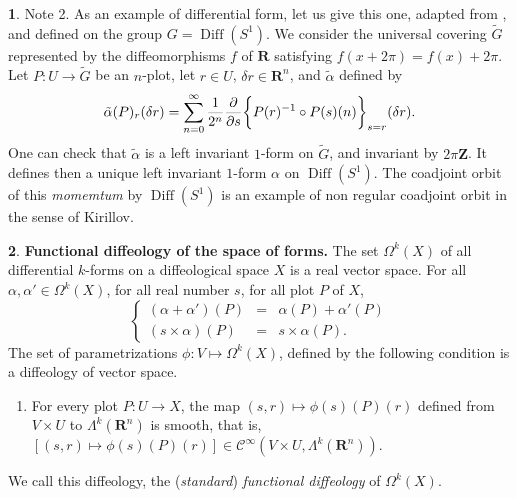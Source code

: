 \documentclass[11pt,reqno]{amsart}
\theoremstyle{definition}
\newtheorem{article}{}
\newcommand{\artlabel}[1]{{\bf #1.}}
\renewcommand{\over}{\above .2pt}
\newcommand{\RR}{{\mathbf R}}
\newcommand{\ZZ}{{\mathbf Z}}
\def \G{{G}}
\def \P{{P}}
\def \S{{S}}
\def \U{{U}}
\def \V{{V}}
\def \X{{X}}
\newcommand{\cC}{{\mathcal C}}
\newcommand{\DForms}{\Omega}
\newcommand{\Cinf}{{\cC}^\infty}
\newcommand{\Diff}{\operatorname{Diff}}
\begin{document}
\begin{article}
    {\sc Note 2.} As an example of differential form, let us give this one,
    adapted from \cite{Don94}, and defined on the group
    $\G = \Diff(S^1)$. We consider the universal covering $\tilde \G$
    represented by the diffeomorphisms $f$ of $\RR$ satisfying $f(x + 2\pi) = f(x) + 2\pi$.
    Let $\P : \U \to \tilde\G$ be an $n$-plot, 
    let $r \in \U$, $\delta r \in \RR^n$, and $\tilde\alpha$ defined by
    $$
    \tilde\alpha(\P)_r(\delta r) = \sum_{n=0}^\infty {1 \over 2^n} 
    {\partial \over \partial s}\bigg\{\P(r)^{-1} \circ \P(s)(n)\bigg\}_{s=r} (\delta r).
    $$
    One can check that $\tilde\alpha$ is a left invariant $1$-form on $\tilde\G$, and 
    invariant by $2\pi\ZZ$. It defines then a unique left invariant $1$-form $\alpha$ on
    $\Diff(\S^1)$. The coadjoint orbit of this {\em momemtum} by $\Diff(\S^1)$ is an
    example of non regular coadjoint orbit in the sense of Kirillov.
  \end{article} %
  
  \begin{article}\artlabel{Functional diffeology of the space of forms}
    \label{Functional-diffeology-of-the-space-of-forms} 
    The set $\Omega^k(\X)$ of all differential $k$-forms on a
    diffeological space $\X$ is a real vector space. For
    all $\alpha,\alpha' \in \Omega^k(\X)$, for all real number $s$,
    for all plot $\P$ of $\X$,
    $$
      \left\{
      \begin{array}{rcl}
      (\alpha + \alpha')(\P) & = & \alpha(\P) +
      \alpha'(\P) \\ (s\times \alpha)(\P) & = & s\times
      \alpha(\P). \end{array}
      \right.
      $$
    The set of parametrizations $\phi: \V \mapsto
      \DForms^k(\X)$, defined by
    the following condition is a diffeology of vector space.
    \begin{enumerate}
      \item[$\clubsuit$] For every plot $\P: \U \to
        \X$, the map $(s,r) \mapsto  \phi(s)(\P)(r)$ defined
      from $\V \times \U$ to $\Lambda^k(\RR^n)$ is smooth,
      that is, $[(s,r) \mapsto \phi(s)(\P)(r)] \in \Cinf(\V
        \times \U,\Lambda^k(\RR^n))$.
    \end{enumerate}
    We call this diffeology, 
    the ({\em standard\/}) {\em functional diffeology} of $\Omega^k(\X)$.
  \end{article} %
  
\end{document}
